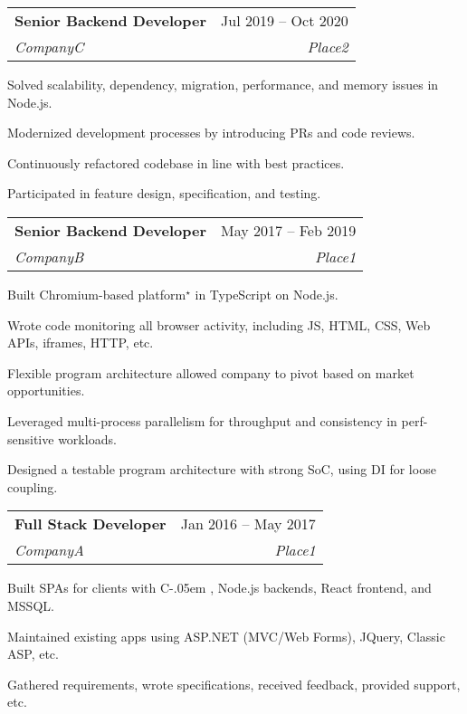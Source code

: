 \documentclass[a4paper,11pt]{article}
\makeatletter
\newcommand{\sharplang}[1]{%
    {\settoheight{\dimen0}{#1}#1\kern-.05em \resizebox{!}{\dimen0}{\raisebox{\depth}{\#}}}%
}
\newcommand{\placeblock}[4]{%
    \vspace{-2pt}\item%
    \begin{tabular*}{0.97\textwidth}[t]{l@{\extracolsep{\fill}}r}%
        \textbf{#1} & #2 \\%
        \textit{\small#3} & \textit{\small #4} \\%
    \end{tabular*}\vspace{-7pt}%
}%
\newenvironment*{place}[4]{%
    \placeblock{#1}{#2}{#3}{#4}
    \begin{itemList}
}{%
    \end{itemList}
}%
\newcommand{\eternitech}{Eternitech}
\newcommand{\reflectiz}{Reflectiz}
\newcommand{\appdome}{Appdome}
\newcommand{\ramatgan}{Ramat Gan, Israel}
\newcommand{\telaviv}{Tel Aviv}
\renewcommand{\eternitech}{CompanyA}
\renewcommand{\reflectiz}{CompanyB}
\renewcommand{\appdome}{CompanyC}
\renewcommand{\ramatgan}{Place1}
\renewcommand{\telaviv}{Place2}
\newenvironment{jobAppdome}{%
    \begin{place}{Senior Backend Developer}{Jul 2019 -- Oct 2020}{\appdome}{\telaviv}
}{
    \end{place}
}
\newenvironment{jobReflectizDev}{%
    \begin{place}
        {Senior Backend Developer}{May 2017 -- Feb 2019}
        {\reflectiz}{\ramatgan}
}{%
    \end{place}
}
\newenvironment{jobEternitech}{%
    \begin{place}{Full Stack Developer}{Jan 2016 -- May 2017}
        {\eternitech}{\ramatgan}%
}{%
    \end{place}
}
\makeatother
\begin{document}
\begin{sectionList}
    \begin{jobAppdome}
        \item Solved scalability, dependency, migration, performance, and memory issues in Node.js.
        \item Modernized development processes by introducing PRs and code reviews.
        \item Continuously refactored codebase in line with best practices.
        \item Participated in feature design, specification, and testing.
    \end{jobAppdome}

    \begin{jobReflectizDev}
        \item Built Chromium-based platform$^\star$ in TypeScript on Node.js.
        \item Wrote code monitoring all browser activity, including JS, HTML, CSS, Web APIs, iframes, HTTP, etc.
        \item Flexible program architecture allowed company to pivot based on market opportunities.
        \item Leveraged multi-process parallelism for throughput and consistency in perf-sensitive workloads.
        \item Designed a testable program architecture with strong SoC, using DI for loose coupling.
    \end{jobReflectizDev}
    \begin{jobEternitech}
        \item Built SPAs for clients with \sharplang{C}, Node.js backends, React frontend, and MSSQL.\@
        \item Maintained existing apps using ASP.NET (MVC/Web Forms), JQuery, Classic ASP, etc.
        \item Gathered requirements, wrote specifications, received feedback, provided support, etc.
    \end{jobEternitech}
\end{sectionList}%


\end{document}
